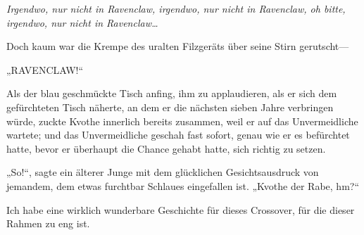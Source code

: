\emph{Irgendwo, nur nicht in Ravenclaw, irgendwo, nur nicht in Ravenclaw, oh bitte, irgendwo, nur nicht in Ravenclaw…}

Doch kaum war die Krempe des uralten Filzgeräts über seine Stirn gerutscht—

„RAVENCLAW!“

Als der blau geschmückte Tisch anfing, ihm zu applaudieren, als er sich dem gefürchteten Tisch näherte, an dem er die nächsten sieben Jahre verbringen würde, zuckte Kvothe innerlich bereits zusammen, weil er auf das Unvermeidliche wartete; und das Unvermeidliche geschah fast sofort, genau wie er es befürchtet hatte, bevor er überhaupt die Chance gehabt hatte, sich richtig zu setzen.

„So!“, sagte ein älterer Junge mit dem glücklichen Gesichtsausdruck von jemandem, dem etwas furchtbar Schlaues eingefallen ist. „Kvothe der Rabe, hm?“


Ich habe eine wirklich wunderbare Geschichte für dieses Crossover, für die dieser Rahmen zu eng ist.

